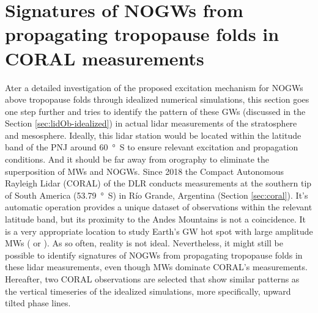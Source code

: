 \section{Signatures of NOGWs from propagating tropopause folds in CORAL measurements}
\label{sec:lidOb-coral}

Ater a detailed investigation of the proposed excitation mechanism for NOGWs above tropopause folds through idealized numerical simulations, this section goes one step further and tries to identify the pattern of these GWs (discussed in the Section \ref{sec:lidOb-idealized}) in actual lidar measurements of the stratosphere and mesosphere. Ideally, this lidar station would be located within the latitude band of the PNJ around \SI{60}{\degree S} to ensure relevant excitation and propagation conditions. And it should be far away from orography to eliminate the superposition of MWs and NOGWs. Since 2018 the Compact Autonomous Rayleigh Lidar (CORAL) of the DLR conducts measurements at the southern tip of South America (\SI{53.79}{\degree S}) in Río Grande, Argentina (Section \ref{sec:coral}). It's automatic operation provides a unique dataset of observations within the relevant latitude band, but its proximity to the Andes Mountains is not a coincidence. It is a very appropriate location to study Earth's GW hot spot with large amplitude MWs (\cite[]{rapp_southtrac-gw_2021} or \cite[]{reichert_highcadence_2021}). As so often, reality is not ideal. Nevertheless, it might still be possible to identify signatures of NOGWs from propagating tropopause folds in these lidar measurements, even though MWs dominate CORAL's measurements. Hereafter, two CORAL observations are selected that show similar patterns as the vertical timeseries of the idealized simulations, more specifically, upward tilted phase lines. 

